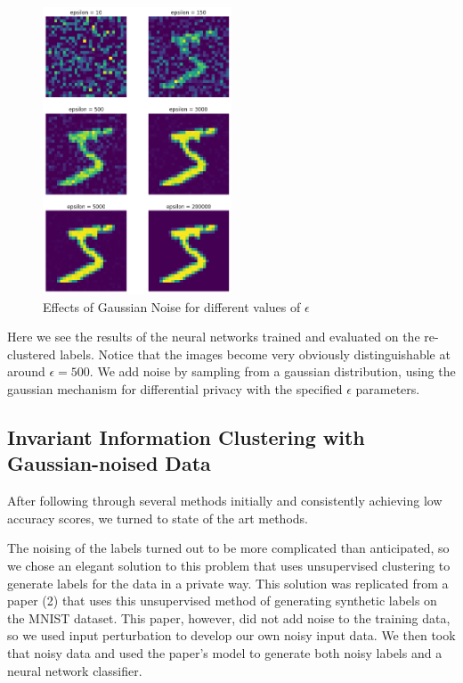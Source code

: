 \documentclass[12pt]{report}
\begin{document}
\begin{figure}[H]
  \centering
    \includegraphics[width=0.5\textwidth]{figures/epsilons.png}
      \caption{Effects of Gaussian Noise for different values of $\epsilon$}
\end{figure}

Here we see the results of the neural networks trained and evaluated on the re-clustered labels. Notice that the images become very obviously distinguishable at around $\epsilon = 500$. We add noise by sampling from a gaussian distribution, using the gaussian mechanism for differential privacy with the specified $\epsilon$ parameters.
\subsection{Invariant Information Clustering with Gaussian-noised Data}
After following through several methods initially and consistently achieving low accuracy scores, we turned to state of the art methods. 

The noising of the labels turned out to be more complicated than anticipated, so we chose an elegant solution to this problem that uses unsupervised clustering to generate labels for the data in a private way. This solution was replicated from a paper (2) that uses this unsupervised method of generating synthetic labels on the MNIST dataset. This paper, however, did not add noise to the training data, so we used input perturbation to develop our own noisy input data. We then took that noisy data and used the paper's model to generate both noisy labels and a neural network classifier. 
\end{document}
